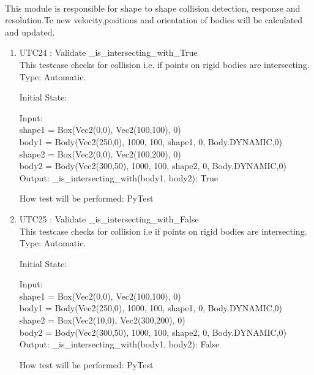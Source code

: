 \documentclass[12pt, titlepage]{article}
\begin{document}
\paragraph{}
This module is responsible for shape to shape collision detection, response and resolution.Te new velocity,positions and orientation of bodies will be calculated and updated.
\begin{enumerate}
	
	
	\item{UTC24} {: Validate \_is\_intersecting\_with\_True \\}
This testcase checks for collision i.e. if points on rigid bodies are intersecting.\\	
	Type: Automatic.
	
	Initial State: 
	
	Input: \\
	shape1 = Box(Vec2(0,0), Vec2(100,100), 0)\\
	body1 = Body(Vec2(250,0), 1000, 100, shape1, 0, Body.DYNAMIC,0)\\
	
	shape2 = Box(Vec2(0,0), Vec2(100,200), 0)\\
	body2 = Body(Vec2(300,50), 1000, 100, shape2, 0, Body.DYNAMIC,0)\\
	
	Output: \_is\_intersecting\_with(body1, body2): True
	
	How test will be performed: PyTest 
	
	\item{UTC25} {: Validate \_is\_intersecting\_with\_False \\}
	This testcase checks for collision i.e if points on rigid bodies are intersecting.\\	
	Type: Automatic.
	
	Initial State: 
	
	Input: \\
	shape1 = Box(Vec2(0,0), Vec2(100,100), 0)\\
	body1 =  Body(Vec2(250,0), 1000, 100, shape1, 0, Body.DYNAMIC,0)\\
	
	shape2 = Box(Vec2(10,0), Vec2(300,200), 0)\\
	body2 = Body(Vec2(300,50), 1000, 100, shape2, 0, Body.DYNAMIC,0)\\
	
	Output: \_is\_intersecting\_with(body1, body2): False
	
	How test will be performed: PyTest 
	
	
\end{enumerate}
\end{document}
